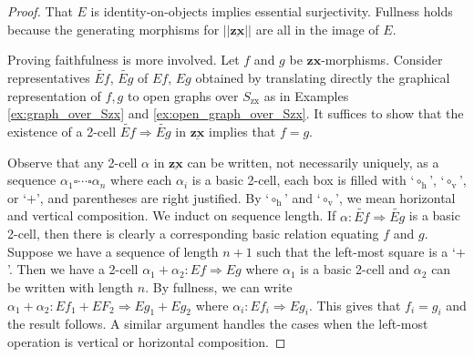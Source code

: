 \begin{proof}
	That $E$ is identity-on-objects
	implies essential surjectivity.  
	Fullness holds because 
	the generating morphisms for 
	$|| \underline{\mathbf{zx}} ||$  
	are all in the image of $E$. 
	
	Proving faithfulness is more involved. 
	Let $f$ and $g$ be $\mathbf{zx}$-morphisms. 
	Consider representatives
	$\widetilde{Ef}$, $\widetilde{Eg}$
	of $Ef$, $Eg$ obtained by 
	translating directly
	the graphical representation of $f,g$ 
	to open graphs over $S_{\text{zx}}$ 
	as in Examples \ref{ex:graph_over_Szx}  
	and \ref{ex:open_graph_over_Szx}. 
	It suffices to show that the 
	existence of a 2-cell 
		$\widetilde{Ef} \Rightarrow \widetilde{Eg}$ 
	in $\underline{\mathbf{zx}}$ 
	implies that $f=g$.  
	
	Observe that any 
	2-cell $\alpha$ in 
	$\underline{\mathbf{zx}}$ 
	can be written, 
	not necessarily uniquely, 
	as a sequence 
		$\alpha_1 \square \dotsm \square \alpha_n$ 
	where each $\alpha_i$ is a basic 2-cell, 
	each box is filled with 
	`$\circ_\text{h}$', `$\circ_\text{v}$', or `$+$', 
	and parentheses are right justified.  
	By `$\circ_\text{h}$' and `$\circ_\text{v}$', 
	we mean horizontal and vertical composition. 
	We induct on sequence length.  
	If $\alpha \colon \widetilde{Ef} \Rightarrow \widetilde{Eg}$ 
	is a basic 2-cell, 
	then there is clearly 
	a corresponding basic relation 
	equating $f$ and $g$.  
	Suppose we have a sequence 
	of length $n+1$ such that 
	the left-most square is a `$+$'. 
	Then we have a 2-cell 
	$\alpha_1 + \alpha_2 \colon Ef \Rightarrow Eg$ 
	where $\alpha_1$ is a basic 2-cell 
	and $\alpha_2$ can be 
	written with length $n$.   
	By fullness, we can write 
	$\alpha_1 + \alpha_2 \colon Ef_1 + EF_2 \Rightarrow Eg_1 + Eg_2$ 
	where $\alpha_i \colon Ef_i \Rightarrow Eg_i$.   
	This gives that $f_i = g_i$  
	and the result follows.  
	A similar argument handles 
	the cases when the 
	left-most operation is 
	vertical or horizontal composition.
\end{proof}
 